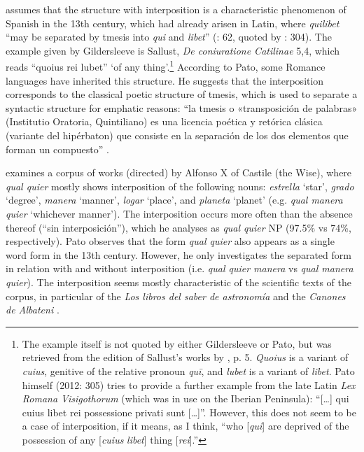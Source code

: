 \documentclass[output=paper]{langscibook}
\begin{document}
  \citet{Pato2012} assumes that the structure with interposition is a characteristic phenomenon of Spanish in the 13th century, which had already arisen in Latin, where \textit{quilibet} “may be separated by tmesis into \textit{qui} and \textit{libet}” (\citealt{GildersleeveLodge1900}: 62, quoted by \citealt{Pato2012}: 304). The example given by Gildersleeve is Sallust, \textit{De coniuratione Catilinae} 5,4, which reads “quoius rei lubet” ‘of any thing’.\footnote{The example itself is not quoted by either Gildersleeve or Pato, but was retrieved from the edition of Sallust’s works by \citet{Ahlberg1919}, p. 5. \textit{Quoius} is a variant of \textit{cuius}, genitive of the relative pronoun \textit{quī}, and \textit{lubet} is a variant of \textit{libet}. \textrm{Pato himself (2012: 305) tries to provide a further example from the late Latin}\textrm{ }\textit{Lex Romana Visigothorum} (which was in use on the Iberian Peninsula): “[…] qui cuius libet rei possessione privati sunt […]”. However, this does not seem to be a case of interposition, if it means, as I think, “who [\textit{qui}] are deprived of the possession of any [\textit{cuius} \textit{libet}] thing [\textit{rei}].”} According to Pato, some Romance languages have inherited this structure. He suggests that the interposition corresponds to the classical poetic structure of tmesis, which is used to separate a syntactic structure for emphatic reasons: “la tmesis o «transposición de palabras» (Institutio Oratoria, Quintiliano) es una licencia poética y retórica clásica (variante del hipérbaton) que consiste en la separación de los dos elementos que forman un compuesto” \citep[280]{Pato2012}. 

  \citet{Pato2012} examines a corpus of works (directed) by Alfonso X of Castile (the Wise), where \textit{qual quier} mostly shows interposition of the following nouns: \textit{estrella} ‘star’, \textit{grado} ‘degree’, \textit{manera} ‘manner’, \textit{logar} ‘place’, and \textit{planeta} ‘planet’ (e.g. \textit{qual manera quier} ‘whichever manner’). The interposition occurs more often than the absence thereof (“sin interposición”), which he analyses as \textit{qual quier} NP (97.5\% vs 74\%, respectively). Pato observes that the form \textit{qual quier} also appears as a single word form in the 13th century. However, he only investigates the separated form in relation with and without interposition (i.e. \textit{qual quier manera} vs \textit{qual manera quier}). The interposition seems mostly characteristic of the scientific texts of the corpus, in particular of the \textit{Los libros del saber de astronomía} and the \textit{Canones de Albateni} \citep[301]{Pato2012}. 
\end{document}
